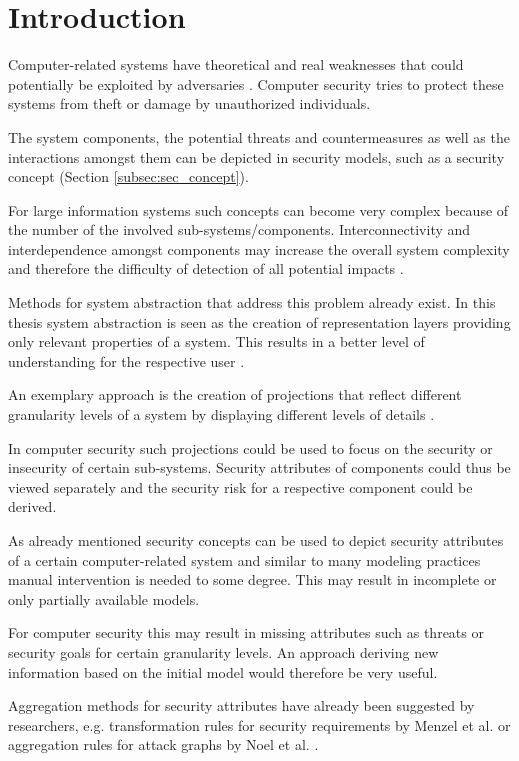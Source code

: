 \section{Introduction}

Computer-related systems have theoretical and real weaknesses that could potentially be exploited by adversaries \cite{Pfleeger:2006:SC:1177321}. Computer security tries to protect these systems from theft or damage by unauthorized individuals. 

The system components, the potential threats and countermeasures as well as the interactions amongst them can be depicted in security models, such as a security concept (Section \ref{subsec:sec_concept}).

For large information systems such concepts can become very complex because of the number of the involved sub-systems/components. Interconnectivity and interdependence amongst components may increase the overall system complexity and therefore the difficulty of detection of all potential impacts \cite{branagan}.

Methods for system abstraction that address this problem already exist. In this thesis system abstraction is seen as the creation of representation layers providing only relevant properties of a system. This results in a better level of understanding for the respective user \cite{pohl}. 

An exemplary approach is the creation of projections that reflect different granularity levels of a system by displaying different levels of details \cite{thyssen2010system}.

In computer security such projections could be used to focus on the security or insecurity of certain sub-systems. Security attributes of components could thus be viewed separately and the security risk for a respective component could be derived. 

As already mentioned security concepts can be used to depict security attributes of a certain computer-related system and similar to many modeling practices manual intervention is needed to some degree. This may result in incomplete or only partially available models. 

For computer security this may result in missing attributes such as threats or security goals for certain granularity levels. An approach deriving new information based on the initial model would therefore be very useful.

Aggregation methods for security attributes have already been suggested by researchers, e.g. transformation rules for security requirements by Menzel et al. \cite{Menzel2008} or aggregation rules for attack graphs by Noel et al. \cite{Noel:2004:MAG:1029208.1029225}. 

